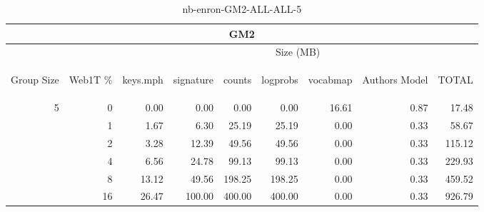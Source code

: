 \begin{center}
\begin{table}[htbp] 
 \begin{center}
\begin{tabular}{ | r | r | r | r | r | r | r | r | r |}
\hline
\multicolumn{9}{|c|}{GM2}\\
\hline
 & & \multicolumn{7}{|c|}{Size (MB)}\\ \cline{3-9}
\begin{sideways}Group Size\end{sideways} & \begin{sideways}Web1T \% \end{sideways} & \begin{sideways}keys.mph\end{sideways} & \begin{sideways}signature\end{sideways} & \begin{sideways}counts\end{sideways} & \begin{sideways}logprobs\end{sideways} & \begin{sideways}vocabmap\end{sideways} & \begin{sideways}Authors Model \end{sideways} & \begin{sideways}TOTAL\end{sideways}\\
\hline
\multirow{5}{*}{5}
 & 0 & 0.00 & 0.00 & 0.00 & 0.00 & 16.61 & 0.87 & 17.48\\ \cline{2-9}
 & 1 & 1.67 & 6.30 & 25.19 & 25.19 & 0.00 & 0.33 & 58.67\\ \cline{2-9}
 & 2 & 3.28 & 12.39 & 49.56 & 49.56 & 0.00 & 0.33 & 115.12\\ \cline{2-9}
 & 4 & 6.56 & 24.78 & 99.13 & 99.13 & 0.00 & 0.33 & 229.93\\ \cline{2-9}
 & 8 & 13.12 & 49.56 & 198.25 & 198.25 & 0.00 & 0.33 & 459.52\\ \cline{2-9}
 & 16 & 26.47 & 100.00 & 400.00 & 400.00 & 0.00 & 0.33 & 926.79\\ \cline{2-9}
\hline
\end{tabular}
\caption{nb-enron-GM2-ALL-ALL-5}
\label{table:nb-enron-GM2-ALL-ALL-5}
\end{center}
 \end{table}
\end{center}

